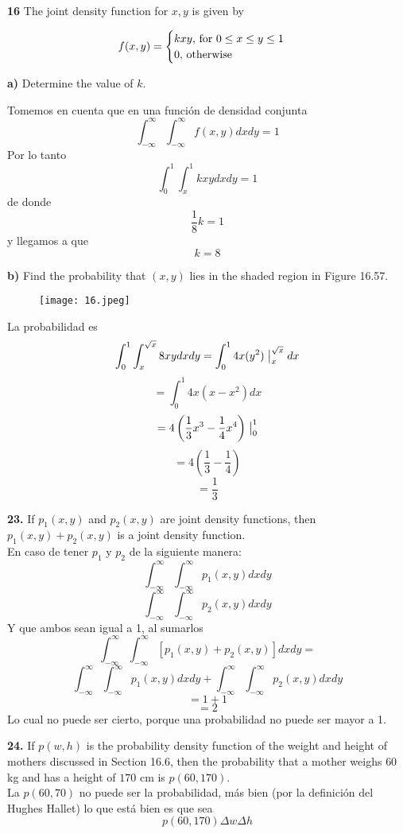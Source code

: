 \documentclass[11pt]{report}
\begin{document}
\newpage

\textbf{16} The joint density function for $x, y$ is given by

\[
    f(x, y) =
    \begin{cases}
        kxy, $ for $ 0 \leq x \leq y \leq 1 \\
        0, $ otherwise $
    \end{cases}
\]


\textbf{a)} Determine the value of $k$.

Tomemos en cuenta que en una función de densidad conjunta
\[ \int_{-\infty}^{\infty} \int_{-\infty}^{\infty} f(x,y) dxdy = 1\]
Por lo tanto
\[ \int_{0}^{1} \int_{x}^{1} kxy dxdy = 1\]
de donde
\[\frac{1}{8} k = 1 \]
y llegamos a que
\[ k = 8 \]


\textbf{b)} Find the probability that $(x, y)$ lies in the shaded region in Figure 16.57.

\begin{figure}[h]
    \centering
    \texttt{[image: 16.jpeg]}
\end{figure}


La probabilidad es
\[ \int_{0}^{1} \int_{x}^{\sqrt{x}} 8xy dxdy = \int_{0}^{1} 4x(y^2) \bigm|_x^{\sqrt{x}} dx \]
\[ = \int_{0}^{1} 4x(x - x^2) dx\]
\[ = 4 \left(\frac{1}{3} x^3 - \frac{1}{4} x^4 \right) \bigm|_0^1 \]
\[ = 4 \left(\frac{1}{3} - \frac{1}{4} \right)	\]
\[ = \frac{1}{3} \]

\newpage

\textbf{23.} If $p_1 (x, y)$ and $p_2 (x, y)$ are joint density functions, then $p_1 (x, y) + p_2 (x, y)$ is a joint density function. \\

En caso de tener $p_1$ y $p_2$ de la siguiente manera:
\[ \int_{-\infty}^{\infty} \int_{-\infty}^{\infty} p_1 (x,y) dxdy\]
\[ \int_{-\infty}^{\infty} \int_{-\infty}^{\infty} p_2 (x,y) dxdy\]
Y que ambos sean igual a 1, al sumarlos
\[ \int_{-\infty}^{\infty} \int_{-\infty}^{\infty} \left[p_1 (x,y) + p_2 (x,y) \right] dxdy =\]
\[\int_{-\infty}^{\infty} \int_{-\infty}^{\infty} p_1 (x,y) dxdy + \int_{-\infty}^{\infty} \int_{-\infty}^{\infty} p_2 (x,y) dxdy  \]
\[ = 1 + 1\]
\[ = 2 \]
Lo cual no puede ser cierto, porque una probabilidad no puede ser mayor a 1.

\newpage

\textbf{24.} If $p(w, h)$ is the probability density function of the weight and height of mothers discussed in Section 16.6, then the probability that a mother weighs $60$ kg and has a height of $170$ cm is $p(60, 170)$. \\

La $p(60, 70)$ no puede ser la probabilidad, más bien (por la definición del Hughes Hallet) lo que está bien es que sea
\[p(60, 170) \Delta w \Delta h\]
\end{document}
